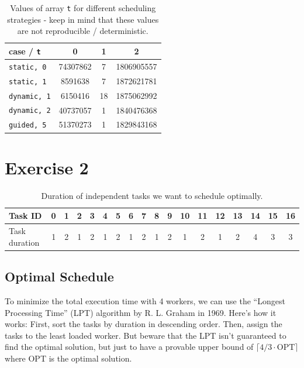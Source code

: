 \documentclass[a4paper,%
7pt,%
DIV12,
headsepline,%
headings=normal,
]{scrartcl}
\begin{document}
\begin{table}[htbp]
    \centering
    \caption{Values of array \texttt{t} for different scheduling strategies - keep in mind that these values are not reproducible / deterministic.}
    \label{tab:values_t}
    \begin{tabular}{l*{3}{c}}
        \toprule
        case / \texttt{t} & 0 & 1 & 2 \\
        \midrule
        \texttt{static, 0} & 74307862 & 7 & 1806905557 \\
        \texttt{static, 1} & 8591638 & 7 & 1872621781 \\
        \texttt{dynamic, 1} & 6150416 & 18 & 1875062992 \\
        \texttt{dynamic, 2} & 40737057 & 1 & 1840476368 \\
        \texttt{guided, 5} & 51370273 & 1 & 1829843168 \\
        \bottomrule
    \end{tabular}
\end{table}

\section{Exercise 2}

\begin{table}[htbp]
    \centering
    \caption{Duration of independent tasks we want to schedule optimally.}
    \label{tab:task_duration}
    \begin{tabular}{l*{17}{c}}
        \toprule
        Task ID & 0 & 1 & 2 & 3 & 4 & 5 & 6 & 7 & 8 & 9 & 10 & 11 & 12 & 13 & 14 & 15 & 16 \\
        \midrule
        Task duration & 1 & 2 & 1 & 2 & 1 & 2 & 1 & 2 & 1 & 2 & 1 & 2 & 1 & 2 & 4 & 3 & 3 \\
        \bottomrule
    \end{tabular}
\end{table}

\subsection{Optimal Schedule}

To minimize the total execution time with 4 workers, we can use the ``Longest Processing Time'' (LPT) algorithm by R. L. Graham in 1969. Here's how it works: First, sort the tasks by duration in descending order. Then, assign the tasks to the least loaded worker. But beware that the LPT isn't guaranteed to find the optimal solution, but just to have a provable upper bound of $\lceil 4/3 \cdot \text{OPT} \rceil$ where OPT is the optimal solution.
\end{document}
